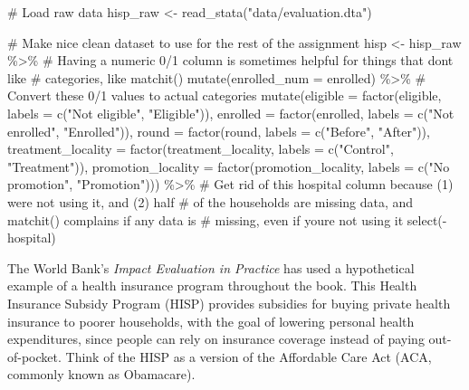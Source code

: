\documentclass[
  letterpaper,
  DIV=11,
  numbers=noendperiod]{scrartcl}
\newenvironment{Shaded}{\begin{snugshade}}{\end{snugshade}}
\newcommand{\AttributeTok}[1]{\textcolor[rgb]{0.40,0.45,0.13}{#1}}
\newcommand{\CommentTok}[1]{\textcolor[rgb]{0.37,0.37,0.37}{#1}}
\newcommand{\FunctionTok}[1]{\textcolor[rgb]{0.28,0.35,0.67}{#1}}
\newcommand{\NormalTok}[1]{\textcolor[rgb]{0.00,0.23,0.31}{#1}}
\newcommand{\OtherTok}[1]{\textcolor[rgb]{0.00,0.23,0.31}{#1}}
\newcommand{\SpecialCharTok}[1]{\textcolor[rgb]{0.37,0.37,0.37}{#1}}
\newcommand{\StringTok}[1]{\textcolor[rgb]{0.13,0.47,0.30}{#1}}
\begin{document}
\begin{Shaded}
\begin{Highlighting}[numbers=left,,]
\CommentTok{\# Load raw data}
\NormalTok{hisp\_raw }\OtherTok{\textless{}{-}} \FunctionTok{read\_stata}\NormalTok{(}\StringTok{"data/evaluation.dta"}\NormalTok{)}

\CommentTok{\# Make nice clean dataset to use for the rest of the assignment}
\NormalTok{hisp }\OtherTok{\textless{}{-}}\NormalTok{ hisp\_raw }\SpecialCharTok{\%\textgreater{}\%} 
  \CommentTok{\# Having a numeric 0/1 column is sometimes helpful for things that don\textquotesingle{}t like}
  \CommentTok{\# categories, like matchit()}
  \FunctionTok{mutate}\NormalTok{(}\AttributeTok{enrolled\_num =}\NormalTok{ enrolled) }\SpecialCharTok{\%\textgreater{}\%} 
  \CommentTok{\# Convert these 0/1 values to actual categories}
  \FunctionTok{mutate}\NormalTok{(}\AttributeTok{eligible =} \FunctionTok{factor}\NormalTok{(eligible, }\AttributeTok{labels =} \FunctionTok{c}\NormalTok{(}\StringTok{"Not eligible"}\NormalTok{, }\StringTok{"Eligible"}\NormalTok{)),}
         \AttributeTok{enrolled =} \FunctionTok{factor}\NormalTok{(enrolled, }\AttributeTok{labels =} \FunctionTok{c}\NormalTok{(}\StringTok{"Not enrolled"}\NormalTok{, }\StringTok{"Enrolled"}\NormalTok{)),}
         \AttributeTok{round =} \FunctionTok{factor}\NormalTok{(round, }\AttributeTok{labels =} \FunctionTok{c}\NormalTok{(}\StringTok{"Before"}\NormalTok{, }\StringTok{"After"}\NormalTok{)),}
         \AttributeTok{treatment\_locality =} \FunctionTok{factor}\NormalTok{(treatment\_locality, }
                                     \AttributeTok{labels =} \FunctionTok{c}\NormalTok{(}\StringTok{"Control"}\NormalTok{, }\StringTok{"Treatment"}\NormalTok{)),}
         \AttributeTok{promotion\_locality =} \FunctionTok{factor}\NormalTok{(promotion\_locality, }
                                     \AttributeTok{labels =} \FunctionTok{c}\NormalTok{(}\StringTok{"No promotion"}\NormalTok{, }\StringTok{"Promotion"}\NormalTok{))) }\SpecialCharTok{\%\textgreater{}\%} 
  \CommentTok{\# Get rid of this hospital column because (1) we\textquotesingle{}re not using it, and (2) half}
  \CommentTok{\# of the households are missing data, and matchit() complains if any data is}
  \CommentTok{\# missing, even if you\textquotesingle{}re not using it}
  \FunctionTok{select}\NormalTok{(}\SpecialCharTok{{-}}\NormalTok{hospital)}
\end{Highlighting}
\end{Shaded}

The World Bank's \emph{Impact Evaluation in Practice} has used a
hypothetical example of a health insurance program throughout the book.
This Health Insurance Subsidy Program (HISP) provides subsidies for
buying private health insurance to poorer households, with the goal of
lowering personal health expenditures, since people can rely on
insurance coverage instead of paying out-of-pocket. Think of the HISP as
a version of the Affordable Care Act (ACA, commonly known as Obamacare).
\end{document}
